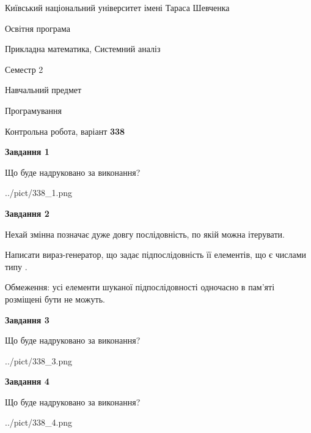 \documentclass[12pt, ukrainian]{article}
\begin{document}
{{\begin {small}\par
{ \center  Київський національний університет імені Тараса Шевченка \par}
{\parbox {5 cm}{Освітня програма \hfill}{\parbox {8 cm}{Прикладна математика, Системний аналіз \hfill}}\parbox {5 cm}{\hfill Семестр 2}}\par
{\parbox {5 cm} {Навчальний предмет \hfill}\parbox {7 cm}{Програмування \hfill}\parbox {6cm}{\hfill}\par}\vspace{-7pt} \end{small}}{\center Контрольна робота, варіант  \No \textbf
{ 338 }\par}}
{
\begin {large}
{\begin {center}\textbf{Завдання 1}\end {center}}\par
Що буде надруковано за виконання?\par\par
\begin{center}
	{../pict/338_1.png}
\end{center}
\newpage

{\begin {center}\textbf{Завдання 2}\end {center}}\par
Нехай змінна  позначає дуже довгу послідовність, по якій можна ітерувати.

Написати вираз-генератор, що задає підпослідовність її елементів, що є числами типу .

Обмеження: усі елементи шуканої підпослідовності одночасно в пам'яті розміщені бути не можуть.\par
\newpage

{\begin {center}\textbf{Завдання 3}\end {center}}\par
Що буде надруковано за виконання?\par
\begin{center}
	{../pict/338_3.png}
\end{center}
\newpage

{\begin {center}\textbf{Завдання 4}\end {center}}\par
Що буде надруковано за виконання?\par
\begin{center}
	{../pict/338_4.png}
\end{center}
\newpage


\end{large}}
\end{document}
